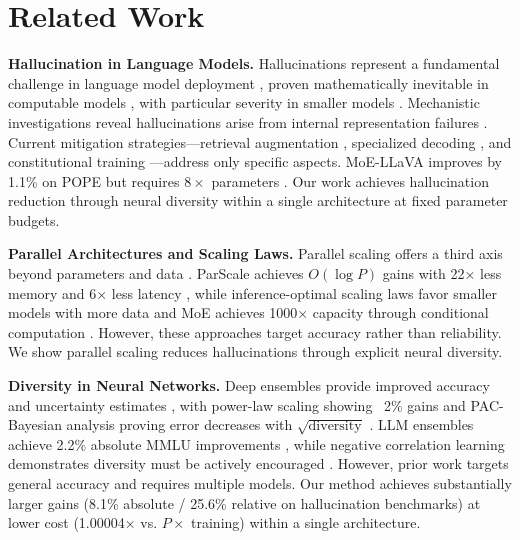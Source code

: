 \documentclass{article} %
\begin{document}
\section{Related Work}
\textbf{Hallucination in Language Models.}
Hallucinations represent a fundamental challenge in language model deployment \citep{huang2024survey,
tonmoy2024comprehensive},
proven mathematically inevitable in computable models \citep{xu2024inevitable, kalai2024calibrated}, with
particular severity in smaller models \citep{lin2021truthfulqa, li2023halueval}. Mechanistic investigations
reveal hallucinations arise from internal representation failures \citep{yu2024mechanistic, ferrando2025knowledge}.
Current mitigation strategies---retrieval augmentation \citep{niu2024ragtruth}, specialized decoding
\citep{li2023contrastive, manakul2023selfcheck, wei2024longform}, and constitutional training
\citep{bai2022constitutional}---address only specific aspects. MoE-LLaVA improves by 1.1\% on POPE but requires
$8\times$ parameters \citep{zhang2024moellava}. Our work achieves hallucination reduction through neural diversity
within a single architecture at fixed parameter budgets.

\textbf{Parallel Architectures and Scaling Laws.}
Parallel scaling offers a third axis beyond parameters and data \citep{chen2025parscale, kaplan2020scaling}.
ParScale achieves $O(\log P)$ gains with 22× less memory and 6× less latency \citep{chen2025parscale}, while
inference-optimal scaling laws favor smaller models with more data \citep{sardana2024beyond} and MoE achieves
1000× capacity through conditional computation \citep{shazeer2017sparsely}. However, these approaches target
accuracy rather than reliability. We show parallel scaling reduces hallucinations through explicit neural diversity.

\textbf{Diversity in Neural Networks.}
Deep ensembles provide improved accuracy and uncertainty estimates \citep{lakshminarayanan2017deep}, with
power-law scaling showing ~2\% gains \citep{lobacheva2020power} and PAC-Bayesian analysis proving error decreases
with $\sqrt{\text{diversity}}$ \citep{ortega2022diversity}. LLM ensembles achieve 2.2\% absolute MMLU improvements
\citep{tekin2024llmtopla}, while negative correlation learning demonstrates diversity must be actively encouraged
\citep{liu1999ensemble}. However, prior work targets general accuracy and requires multiple models. Our method
achieves substantially larger gains (8.1\% absolute / 25.6\% relative on hallucination benchmarks) at lower cost
(1.00004$\times$ vs. $P\times$ training) within a single architecture.
\end{document}
